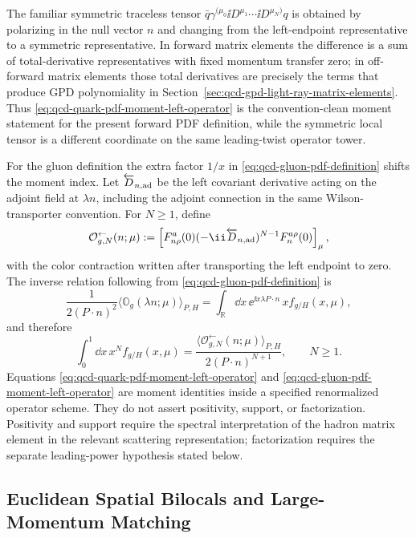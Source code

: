 The familiar symmetric traceless tensor
\(\bar q\gamma^{(\mu_0}\ii D^{\mu_1}\cdots\ii D^{\mu_N)}q\) is obtained by
polarizing in the null vector \(n\) and changing from the left-endpoint
representative to a symmetric representative.  In forward matrix elements the
difference is a sum of total-derivative representatives with fixed momentum
transfer zero; in off-forward matrix elements those total derivatives are
precisely the terms that produce GPD polynomiality in
Section~\ref{sec:qcd-gpd-light-ray-matrix-elements}.  Thus
\eqref{eq:qcd-quark-pdf-moment-left-operator} is the convention-clean moment
statement for the present forward PDF definition, while the symmetric local
tensor is a different coordinate on the same leading-twist operator tower.

For the gluon definition the extra factor \(1/x\) in
\eqref{eq:qcd-gluon-pdf-definition} shifts the moment index.  Let
\(\overleftarrow D_{n,{\rm ad}}\) be the left covariant derivative acting on
the adjoint field at \(\lambda n\), including the adjoint connection in the
same Wilson-transporter convention.  For \(N\ge1\), define
\begin{equation}
  \mathcal O_{g,N}^{\leftarrow}(n;\mu)
  :=
  \left[
    F^a_{n\rho}(0)
    (-\ii\overleftarrow D_{n,{\rm ad}})^{N-1}
    F_n^{a\rho}(0)
  \right]_{\mu},
  \label{eq:qcd-gluon-left-moment-operator}
\end{equation}
with the color contraction written after transporting the left endpoint to
zero.  The inverse relation following from
\eqref{eq:qcd-gluon-pdf-definition} is
\[
  \frac{1}{2(P\cdot n)^2}
  \langle\mathbb O_g(\lambda n;\mu)\rangle_{P,H}
  =
  \int_{\mathbb R}\dd x\,
  \ee^{\ii x\lambda P\cdot n}\,x f_{g/H}(x,\mu),
\]
and therefore
\begin{equation}
  \int_0^1\dd x\,x^N f_{g/H}(x,\mu)
  =
  \frac{
    \langle\mathcal O_{g,N}^{\leftarrow}(n;\mu)\rangle_{P,H}
  }{
    2(P\cdot n)^{N+1}
  },
  \qquad N\ge1 .
  \label{eq:qcd-gluon-pdf-moment-left-operator}
\end{equation}
Equations
\eqref{eq:qcd-quark-pdf-moment-left-operator} and
\eqref{eq:qcd-gluon-pdf-moment-left-operator} are moment identities inside a
specified renormalized operator scheme.  They do not assert positivity,
support, or factorization.  Positivity and support require the spectral
interpretation of the hadron matrix element in the relevant scattering
representation; factorization requires the separate leading-power hypothesis
stated below.

\subsection{Euclidean Spatial Bilocals and Large-Momentum Matching}
\label{subsec:qcd-euclidean-bilocals-quasi-pdfs}

